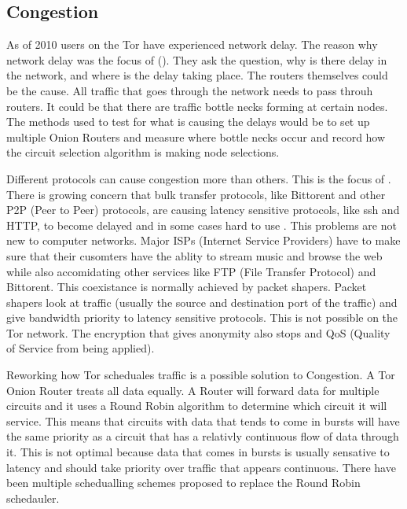 \documentclass[letterpaper,12pt]{texMemo}
\begin{document}
    \subsection*{Congestion}
    As of 2010 users on the Tor have experienced network delay. The reason why network
    delay was the focus of (\citeauthor[2]{delay}). They ask the question, why is there delay in the network,
    and where is the delay taking place. The routers themselves could be the cause. All traffic that
    goes through the network needs to pass throuh routers. It could be that there are traffic bottle
    necks forming at certain nodes. The methods used to test for what is causing the delays would be
    to set up multiple Onion Routers and measure where bottle necks occur and record how the circuit
    selection algorithm is making node selections.

    Different protocols can cause congestion more than others. This is the focus of .
    There is growing concern that bulk transfer protocols, like Bittorent and other P2P (Peer to
    Peer) protocols, are causing latency sensitive protocols, like ssh and HTTP, to become delayed
    and in some cases hard to use \citep[]{analysis}. This problems are not new to computer networks.
    Major ISPs (Internet Service Providers) have to make sure that their cusomters have the ablity
    to stream music and browse the web while also accomidating other services like FTP (File Transfer
    Protocol) and Bittorent. This coexistance is normally achieved by packet shapers. Packet shapers
    look at traffic (usually the source and destination port of the traffic) and give bandwidth
    priority to latency sensitive protocols. This is not possible on the Tor network. The encryption
    that gives anonymity also stops and QoS (Quality of Service from being applied).

    Reworking how Tor scheduales traffic is a possible solution to Congestion.  A Tor Onion Router
    treats all data equally. A Router will forward data for multiple circuits and it uses a Round Robin
    algorithm to determine which circuit it will service. This means that circuits with data that
    tends to come in bursts will have the same priority as a circuit that has a relativly
    continuous flow of data through it. This is not optimal because data that comes in bursts is usually
    sensative to latency and should take priority over traffic that appears continuous. \citep[]{Tang}
    There have been multiple schedualling schemes proposed to replace the Round Robin schedauler.
\end{document}
